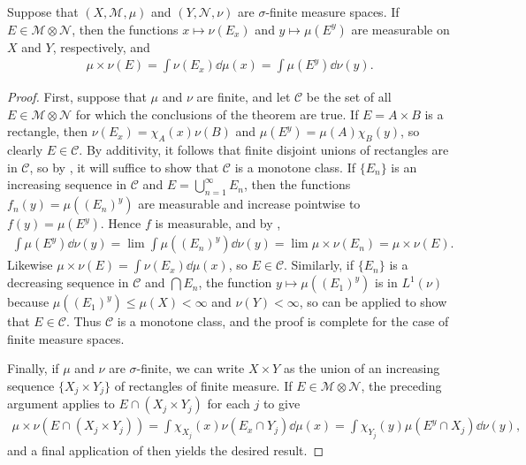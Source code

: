 \begin{theorem}
    \labthm{}
    Suppose that $(X, \mathcal{M}, \mu)$ and  $(Y, \mathcal{N}, \nu)$ are $\sigma$-finite measure spaces.
    If $E \in \mathcal{M} \otimes \mathcal{N}$, then the functions $x \mapsto \nu(E_x)$ and $y \mapsto \mu(E^y)$ are measurable on $X$ and $Y$, respectively, and
    \begin{align}
        \mu \times \nu(E) = \int \nu(E_x) \dd \mu(x) = \int \mu(E^y) \dd \nu(y).
    \end{align}
\end{theorem}

\begin{proof}
    First, suppose that $\mu$ and $\nu$ are finite, and let $\mathcal{C}$ be the set of all $E \in \mathcal{M} \otimes \mathcal{N}$ for which the conclusions of the theorem are true.
    If $E = A \times B$ is a rectangle, then $\nu(E_x) = \chi_{A}(x) \nu(B)$ and $\mu(E^y) = \mu(A) \chi_{B}(y)$, so clearly $E \in \mathcal{C}$.
    By additivity, it follows that finite disjoint unions of rectangles are in $\mathcal{C}$, so by , it will suffice to show that $\mathcal{C}$ is a monotone class.
    If $\{ E_n \}$ is an increasing sequence in $\mathcal{C}$ and $E = \bigcup_{n=1}^{\infty} E_n$, then the functions $f_n(y) = \mu((E_n)^y)$ are measurable and increase pointwise to $f(y) = \mu(E^y)$.
    Hence $f$ is measurable, and by , 
    \begin{align}
        \int \mu(E^y) \dd \nu(y) = \lim \int \mu((E_n)^y) \dd \nu(y) = \lim \mu \times \nu (E_n) = \mu \times \nu(E).
    \end{align}
    Likewise $\mu \times \nu(E) = \int \nu(E_x) \dd \mu(x)$, so $E \in \mathcal{C}$.
    Similarly, if $\{ E_n \}$ is a decreasing sequence in $\mathcal{C}$ and $\bigcap E_n$, the function $y \mapsto \mu((E_1)^y)$ is in $L^1(\nu)$ because $\mu((E_1)^y) \le \mu(X) < \infty$ and $\nu(Y) < \infty$, so  can be applied to show that $E \in \mathcal{C}$.
    Thus $\mathcal{C}$ is a monotone class, and the proof is complete for the case of finite measure spaces.

    Finally, if $\mu$ and $\nu$ are $\sigma$-finite, we can write $X \times Y$ as the union of an increasing sequence $\{ X_j \times Y_j \}$ of rectangles of finite measure.
    If $E \in \mathcal{M} \otimes \mathcal{N}$, the preceding argument applies to $E \cap (X_j \times Y_j)$ for each $j$ to give
    \begin{align}
        \mu \times \nu(E \cap (X_j \times Y_j)) = \int \chi_{X_j}(x) \nu(E_x \cap Y_j) \dd \mu(x) = \int \chi_{Y_j}(y) \mu(E^y \cap X_j) \dd \nu(y),
    \end{align}
    and a final application of  then yields the desired result.
\end{proof}

